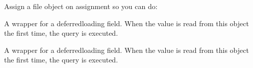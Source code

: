 \documentclass[letterpaper,10pt,spanish]{sphinxmanual}
\begin{document}
\begin{fulllineitems}
\begin{fulllineitems}
\begin{sphinxVerbatim}[commandchars=\\\{\}]
   
  
\end{sphinxVerbatim}

\sphinxAtStartPar
Assign a file object on assignment so you can do:

\begin{sphinxVerbatim}[commandchars=\\\{\}]
   
      
\end{sphinxVerbatim}

\end{fulllineitems}



\begin{fulllineitems}

\pysigstartsignatures
{}
\pysigstopsignatures
\sphinxAtStartPar
A wrapper for a deferred\sphinxhyphen{}loading field. When the value is read from this
object the first time, the query is executed.

\end{fulllineitems}



\begin{fulllineitems}

\pysigstartsignatures
{}
\pysigstopsignatures
\end{fulllineitems}



\begin{fulllineitems}

\pysigstartsignatures
{}
\pysigstopsignatures
\sphinxAtStartPar
A wrapper for a deferred\sphinxhyphen{}loading field. When the value is read from this
object the first time, the query is executed.


\end{fulllineitems}
\end{fulllineitems}
\end{document}

